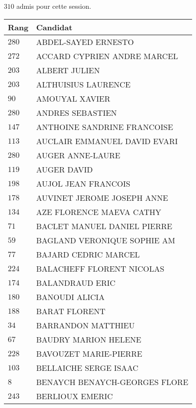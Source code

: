 




  $310$ admis pour cette session.

  \begin{xltabular}{\linewidth}{|l|X|}
    \hline
    \textbf{Rang} & \textbf{Candidat} \\
    \hline
    $280$ & ABDEL-SAYED ERNESTO \\
    \hline
    $272$ & ACCARD CYPRIEN ANDRE MARCEL \\
    \hline
    $203$ & ALBERT JULIEN \\
    \hline
    $203$ & ALTHUISIUS LAURENCE \\
    \hline
    $90$ & AMOUYAL XAVIER \\
    \hline
    $280$ & ANDRES SEBASTIEN \\
    \hline
    $147$ & ANTHOINE SANDRINE FRANCOISE \\
    \hline
    $113$ & AUCLAIR EMMANUEL DAVID EVARI \\
    \hline
    $280$ & AUGER ANNE-LAURE \\
    \hline
    $119$ & AUGER DAVID \\
    \hline
    $198$ & AUJOL JEAN FRANCOIS \\
    \hline
    $178$ & AUVINET JEROME JOSEPH ANNE \\
    \hline
    $134$ & AZE FLORENCE MAEVA CATHY \\
    \hline
    $71$ & BACLET MANUEL DANIEL PIERRE \\
    \hline
    $59$ & BAGLAND VERONIQUE SOPHIE AM \\
    \hline
    $77$ & BAJARD CEDRIC MARCEL \\
    \hline
    $224$ & BALACHEFF FLORENT NICOLAS \\
    \hline
    $174$ & BALANDRAUD ERIC \\
    \hline
    $180$ & BANOUDI ALICIA \\
    \hline
    $188$ & BARAT FLORENT \\
    \hline
    $34$ & BARRANDON MATTHIEU \\
    \hline
    $67$ & BAUDRY MARION HELENE \\
    \hline
    $228$ & BAVOUZET MARIE-PIERRE \\
    \hline
    $103$ & BELLAICHE SERGE ISAAC \\
    \hline
    $8$ & BENAYCH BENAYCH-GEORGES FLORE \\
    \hline
    $243$ & BERLIOUX EMERIC \\

\end{xltabular}
